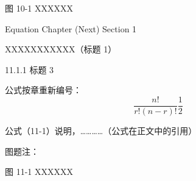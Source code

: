 \documentclass[UTF8, scheme=chinese, openany, oneside]{ctexbook}
\begin{document}
\vspace{0.8cm}

\begin{center}
     图 10-1 \quad XXXXXX
\end{center}

\newpage
{}
\vspace*{5cm}
\begin{center}
{\color{white} Equation Chapter (Next) Section 1}
\end{center}


\clearpage
\setcounter{chapter}{10}
\setcounter{page}{23}


\vspace{1cm}
\begin{center}
{ \quad XXXXXXXXXXX（标题 1）}
\end{center}
\vspace{0.8cm}


\vspace{0.3cm}
\noindent \hspace{2em} { 11.1.1 \quad 标题 3}

\vspace{1.2cm}
\noindent \hspace{2em} 公式按章重新编号：
\vspace{0.6cm}
\begin{equation}
\frac{n!}{r!(n-r)!} \frac{1}{2} \tag{11-1} \label{eq:11-1}
\end{equation}

\vspace{1.8cm}
\noindent \hspace{2em} 公式（11-1）说明，…………（公式在正文中的引用）
\vspace{3.5cm}

\noindent \hspace{2em} 图题注：

\vspace{0.8cm}

\begin{center}
     图 11-1 \quad XXXXXX
\end{center}
\end{document}
